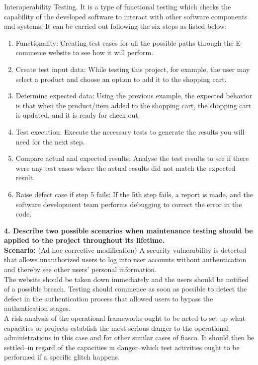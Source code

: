 \documentclass[a4paper,man,natbib]{apa6}
\begin{document}
Interoperability Testing. It is a type of functional testing which checks the capability of the developed software to interact with other software components and systems. It can be carried out following the six steps as listed below:\\

\begin{enumerate}
  \item	Functionality: Creating test cases for all the possible paths through the E-commerce website to see how it will perform.
  \item	Create test input data: While testing this project, for example, the user may select a product and choose an option to add it to the shopping cart.
  \item	Determine expected data: Using the previous example, the expected behavior is that when the product/item added to the shopping cart, the shopping cart is updated, and it is ready for check out.
  \item	Test execution: Execute the necessary tests to generate the results you will need for the next step.
  \item	Compare actual and expected results: Analyse the test results to see if there were any test cases where the actual results did not match the expected result.
  \item	Raise defect case if step 5 fails: If the 5th step fails, a report is made, and the software development team performs debugging to correct the error in the code.
\end{enumerate}

\pagebreak
\noindent
\textbf{4. Describe two possible scenarios when maintenance testing should be applied to the project throughout its lifetime.}\\

\textbf{Scenario:} (Ad-hoc corrective modification) A security vulnerability is detected that allows unauthorized users to log into user accounts without authentication and thereby see other users’ personal information.\\

The website should be taken down immediately and the users should be notified of a possible breach. Testing should commence as soon as possible to detect the defect in the authentication process that allowed users to bypass the authentication stages.\\

A risk analysis of the operational frameworks ought to be acted to set up what capacities or projects establish the most serious danger to the operational administrations in this case and for other similar cases of fiasco. It should then be settled–in regard of the capacities in danger–which test activities ought to be performed if a specific glitch happens.\\
\end{document}
